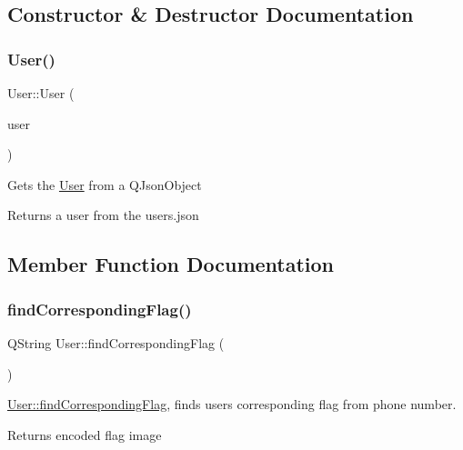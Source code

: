 \subsection{Constructor \& Destructor Documentation}
\mbox{\label{classUser_a78cce0bf7baacf9dcc0ecba524f67b87}} 
\subsubsection{\texorpdfstring{User()}{User()}}
{\footnotesize\ttfamily User\+::\+User (\begin{DoxyParamCaption}\item[{Q\+Json\+Object}]{user }\end{DoxyParamCaption})\hspace{0.3cm}{\ttfamily [explicit]}}

Gets the \hyperlink{classUser}{User} from a Q\+Json\+Object \begin{DoxyReturn}{Returns}
a user from the users.\+json 
\end{DoxyReturn}


\subsection{Member Function Documentation}
\mbox{\label{classUser_ac57cd256ecaaaaabc2475647902740ba}} 
\subsubsection{\texorpdfstring{find\+Corresponding\+Flag()}{findCorrespondingFlag()}}
{\footnotesize\ttfamily Q\+String User\+::find\+Corresponding\+Flag (\begin{DoxyParamCaption}{ }\end{DoxyParamCaption})}



\hyperlink{classUser_ac57cd256ecaaaaabc2475647902740ba}{User\+::find\+Corresponding\+Flag}, finds users corresponding flag from phone number. 

\begin{DoxyReturn}{Returns}
encoded flag image 
\end{DoxyReturn}
\mbox{\label{classUser_a9e1fe4ac5c94a98f82ca09fa0982e029}} 
